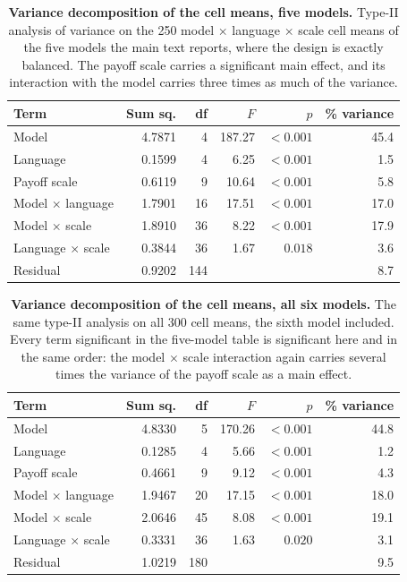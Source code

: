 \documentclass[11pt,a4paper]{article}
\begin{document}
\begin{table}[htbp]
\centering
\footnotesize
\setlength{\tabcolsep}{4pt}
\caption{\textbf{Variance decomposition of the cell means, five models.} Type-II analysis of variance on the 250 model $\times$ language $\times$ scale cell means of the five models the main text reports, where the design is exactly balanced. The payoff scale carries a significant main effect, and its interaction with the model carries three times as much of the variance.}
\label{tab:S-variance}
\begin{tabular}{@{}lrrrrr@{}}
\toprule
Term & Sum sq. & df & $F$ & $p$ & \% variance \\
\midrule
Model & 4.7871 & 4 & 187.27 & $<0.001$ & 45.4 \\
Language & 0.1599 & 4 & 6.25 & $<0.001$ & 1.5 \\
Payoff scale & 0.6119 & 9 & 10.64 & $<0.001$ & 5.8 \\
Model $\times$ language & 1.7901 & 16 & 17.51 & $<0.001$ & 17.0 \\
Model $\times$ scale & 1.8910 & 36 & 8.22 & $<0.001$ & 17.9 \\
Language $\times$ scale & 0.3844 & 36 & 1.67 & $0.018$ & 3.6 \\
Residual & 0.9202 & 144 &  &  & 8.7 \\
\bottomrule
\end{tabular}
\end{table}

\begin{table}[htbp]
\centering
\footnotesize
\setlength{\tabcolsep}{4pt}
\caption{\textbf{Variance decomposition of the cell means, all six models.} The same type-II analysis on all 300 cell means, the sixth model included. Every term significant in the five-model table is significant here and in the same order: the model $\times$ scale interaction again carries several times the variance of the payoff scale as a main effect.}
\label{tab:S-variance-all}
\begin{tabular}{@{}lrrrrr@{}}
\toprule
Term & Sum sq. & df & $F$ & $p$ & \% variance \\
\midrule
Model & 4.8330 & 5 & 170.26 & $<0.001$ & 44.8 \\
Language & 0.1285 & 4 & 5.66 & $<0.001$ & 1.2 \\
Payoff scale & 0.4661 & 9 & 9.12 & $<0.001$ & 4.3 \\
Model $\times$ language & 1.9467 & 20 & 17.15 & $<0.001$ & 18.0 \\
Model $\times$ scale & 2.0646 & 45 & 8.08 & $<0.001$ & 19.1 \\
Language $\times$ scale & 0.3331 & 36 & 1.63 & $0.020$ & 3.1 \\
Residual & 1.0219 & 180 &  &  & 9.5 \\
\bottomrule
\end{tabular}
\end{table}
\end{document}
